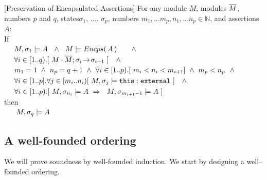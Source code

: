 \begin{auxLemma}
\label{lemma:external_exec_preserves}[Preservation of Encapsulated Assertions]
For any module $M$, modules $\overline{M}$, numbers $p$ and $q$, states$\sigma_1$, .... $\sigma_p$,  numbers $m_1,...m_p, n_1, ... n_p \in \mathbb{N}$, and assertions $A$:
\\
If \\
$\strut \ \ \ \  M, \sigma_1 \models  A   \  \ \wedge \ \ M \models \encaps A \ \ \ \  \ \ \wedge$\\
$\strut \ \ \ \  \forall i\in [1..q).[\   M\cdot \overline{M};\sigma_i\! \rightarrow\! {\sigma_{i+1}}\  ] \  \ \ \wedge$\\
$\strut \ \ \ \  m_1=1 \ \wedge\ n_p=q+1 \  \wedge\ \forall i\in[1..p).[  \  m_i < n_i < m_{i+1}  ] \ \wedge \ m_p<n_p\ \ \wedge  $\\
$\strut \ \ \ \  \forall i\in[1..p].\forall j\in [m_i..n_i)[\   M,\sigma_j \models \texttt{this}:\mbox{\normalfont{\texttt{external}}} \ ] \  \ \ \wedge$\\
$\strut \ \ \ \ \forall i\in[1..p). [ \ M,\sigma_{n_i} \models A   \ \Rightarrow \ \ 
M, {\sigma_{m_{i+1}-1}} \models A  \ ] $ \\
then\\
$\strut \ \ \ \  \ M, \sigma_q \models  A$
\end{auxLemma}



\subsection{A well-founded ordering}
\label{sect:prove:sound}

We will prove soundness by well-founded induction.%
We start by designing a well--founded ordering. 

